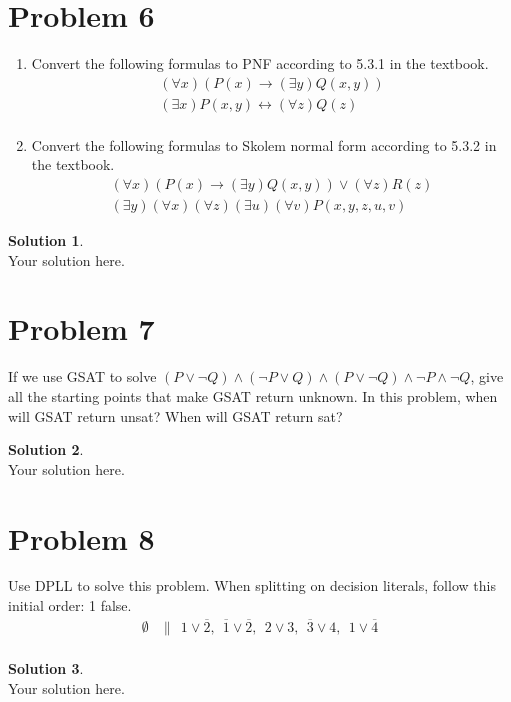 \documentclass[a4paper,UTF8]{article}
\theoremstyle{definition}
\newtheorem*{solution}{Solution}
\begin{document}
\section*{Problem 6}
\begin{enumerate}
\item Convert the following formulas to PNF according to 5.3.1 in the textbook.
\begin{align*}
(\forall x)( P(x)\rightarrow(\exists y)Q(x,y) )\\
(\exists x)P(x,y)\leftrightarrow(\forall z)Q(z)\\
\end{align*}
\item Convert the following formulas to Skolem normal form according to 5.3.2 in the textbook.
\begin{align*}
(\forall x)( P(x)\rightarrow(\exists y)Q(x,y) )\vee(\forall z)R(z)\\
(\exists y)(\forall x)(\forall z)(\exists u)(\forall v)P(x,y,z,u,v)
\end{align*}
\end{enumerate}

\begin{solution}
~\\
Your solution here.
\end{solution}

\section*{Problem 7}
If we use GSAT to solve $(P\vee\neg Q)\wedge(\neg P\vee Q)\wedge(P\vee\neg Q)\wedge\neg P\wedge\neg Q $, give all the starting points that make GSAT return unknown. In this problem, when will GSAT return unsat? When will GSAT return sat?
\begin{solution}
~\\
Your solution here.
\end{solution}

\section*{Problem 8}
Use DPLL to solve this problem. When splitting on decision literals, follow this initial order: 1 false.
\begin{align*}
\emptyset&\parallel~~1\vee\overline{2},~~\overline{1}\vee\overline{2},~~2\vee3,~~\overline{3}\vee4,~~1\vee\overline{4}\\
\end{align*}

\begin{solution}
~\\
Your solution here.
\end{solution}
\end{document}
